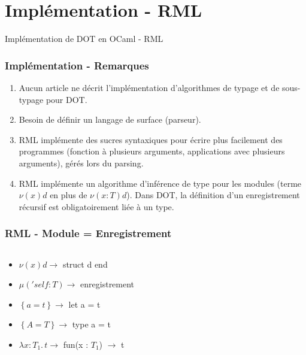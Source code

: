 \documentclass{beamer}
\newcommand{\lambdaExpr}[2]{\lambda #1 . \, #2}
\begin{document}
\section{Implémentation - RML}

\begin{frame}
	\begin{center}
		\Huge{Implémentation de DOT en OCaml - RML}
	\end{center}
\end{frame}

\begin{frame}
  \frametitle{Implémentation - Remarques}
	\begin{center}
    \begin{enumerate}
      \item Aucun article ne décrit l'implémentation d'algorithmes de typage et
        de sous-typage pour DOT.
      \item Besoin de définir un langage de surface (parseur).
      \item RML implémente des sucres syntaxiques pour écrire plus
        facilement des programmes (fonction à plusieurs arguments, applications
        avec plusieurs arguments), gérés lors du parsing.
      \item RML implémente un algorithme d'inférence de type pour les modules
        (terme $\nu(x)d$ en plus de $\nu(x : T)d$).
        Dans DOT, la définition d'un enregistrement récursif est obligatoirement liée à un type.
      \end{enumerate}
	\end{center}
\end{frame}

\begin{frame}
  \frametitle{RML - Module = Enregistrement}
  \inputminted{OCaml}{codes/point2d.rml}
  \begin{itemize}
  \item $\nu(x) d \rightarrow$ struct d end
  \item $\mu('self : T) \rightarrow$ enregistrement
  \item $\left\{ a = t \right\} \rightarrow$ let a = t
  \item $\left\{ A = T \right\} \rightarrow$ type a = t
  \item $\lambdaExpr{x : T_{1}}{t} \rightarrow$ fun(x : $T_{1}$) $\rightarrow$ t
  \end{itemize}
\end{frame}
\end{document}
